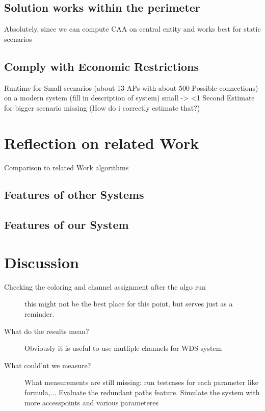   \subsection{Solution works within the perimeter}
    Absolutely, since we can compute CAA on central entity and works best for static scenarios \newline
  \subsection{Comply with Economic Restrictions}
    Runtime for Small scenarios (about 13 APs with about 500 Possible connections) on a modern system (fill in description of system) small -> <1 Second
    Estimate for bigger scenario missing (How do i correctly estimate that?)
\section{Reflection on related Work}
  Comparison to related Work algorithms\newline
  \subsection{Features of other Systems}
  \subsection{Features of our System}
\section{Discussion}
  \begin{description}
   \item [Checking the coloring and channel assignment after the algo run]
   this might not be the best place for this point, but serves just as a reminder.
   \item [What do the results mean?]
   Obviously it is useful to use mutliple channels for WDS system
   \item[What could'nt we measure?]
   What measurements are still missing:  run testcases for each parameter like formula,...
   Evaluate the redundant paths feature.
   Simulate the system with more accesspoints and various parameteres
  \end{description}